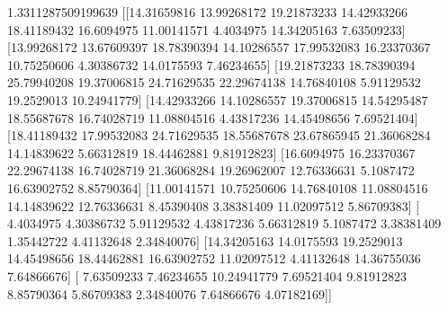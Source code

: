 \documentclass[letterpaper,10pt,english]{sphinxmanual}
\begin{document}
\begin{sphinxVerbatim}[commandchars=\\\{\}]
1.3311287509199639
[[14.31659816 13.99268172 19.21873233 14.42933266 18.41189432 16.6094975
  11.00141571  4.4034975  14.34205163  7.63509233]
 [13.99268172 13.67609397 18.78390394 14.10286557 17.99532083 16.23370367
  10.75250606  4.30386732 14.0175593   7.46234655]
 [19.21873233 18.78390394 25.79940208 19.37006815 24.71629535 22.29674138
  14.76840108  5.91129532 19.2529013  10.24941779]
 [14.42933266 14.10286557 19.37006815 14.54295487 18.55687678 16.74028719
  11.08804516  4.43817236 14.45498656  7.69521404]
 [18.41189432 17.99532083 24.71629535 18.55687678 23.67865945 21.36068284
  14.14839622  5.66312819 18.44462881  9.81912823]
 [16.6094975  16.23370367 22.29674138 16.74028719 21.36068284 19.26962007
  12.76336631  5.1087472  16.63902752  8.85790364]
 [11.00141571 10.75250606 14.76840108 11.08804516 14.14839622 12.76336631
   8.45390408  3.38381409 11.02097512  5.86709383]
 [ 4.4034975   4.30386732  5.91129532  4.43817236  5.66312819  5.1087472
   3.38381409  1.35442722  4.41132648  2.34840076]
 [14.34205163 14.0175593  19.2529013  14.45498656 18.44462881 16.63902752
  11.02097512  4.41132648 14.36755036  7.64866676]
 [ 7.63509233  7.46234655 10.24941779  7.69521404  9.81912823  8.85790364
   5.86709383  2.34840076  7.64866676  4.07182169]]
\end{sphinxVerbatim}
\end{document}
